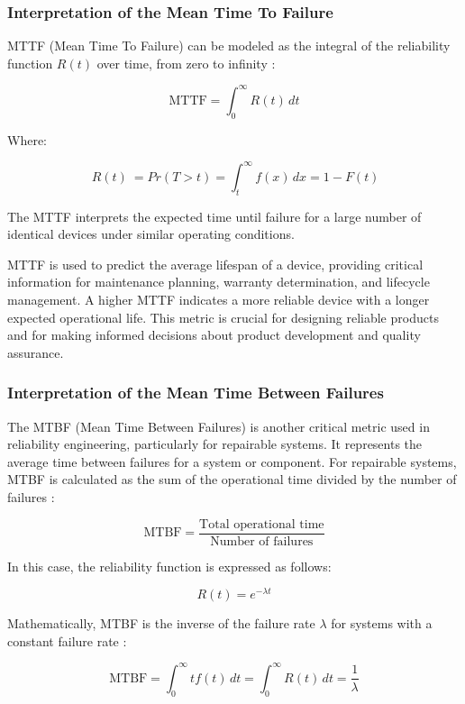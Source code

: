 {	\subsubsection{Interpretation of the Mean Time To Failure}
	\indent	
	
	MTTF (Mean Time To Failure) can be modeled as the integral of the reliability function \( R(t) \) over time, from zero to infinity \cite{Martz2001}:
	
	\[
	\text{MTTF} = \int_{0}^{\infty} R(t) \, dt
	\]
	
	Where:
	
	\[
	\ R(t) \ = Pr(T > t) = \int_{t}^{\infty} f(x) \, dx = 1 - F(t)
	\]
	
	
	The MTTF interprets the expected time until failure for a large number of identical devices under similar operating conditions. 
	
	MTTF is used to predict the average lifespan of a device, providing critical information for maintenance planning, warranty determination, and lifecycle management. A higher MTTF indicates a more reliable device with a longer expected operational life. This metric is crucial for designing reliable products and for making informed decisions about product development and quality assurance.
	
	\subsubsection{Interpretation of the Mean Time Between Failures}
	\indent	
	
	The MTBF (Mean Time Between Failures) is another critical metric used in reliability engineering, particularly for repairable systems. It represents the average time between failures for a system or component. For repairable systems, MTBF is calculated as the sum of the operational time divided by the number of failures \cite{Martz2001}:
	
	\[
	\text{MTBF} = \frac{\text{Total operational time}}{\text{Number of failures}}
	\]
	
	In this case, the reliability function is expressed as follows:
	
	\[
	R(t) = e^{-\lambda t}
	\]
	
	Mathematically, MTBF is the inverse of the failure rate \(\lambda\) for systems with a constant failure rate \cite{Martz2001}:
	
	\[
	\text{MTBF} = \int_{0}^{\infty} tf(t) \, dt = \int_{0}^{\infty} R(t) \, dt = \frac{1}{\lambda}
	\]
	
}
